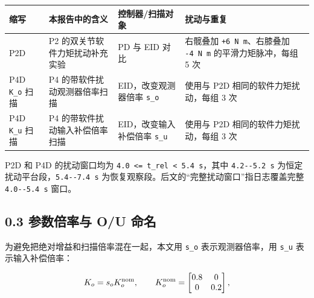\begin{longtable}[]{@{}
  >{\raggedright\arraybackslash}p{}
  >{\raggedright\arraybackslash}p{}
  >{\raggedright\arraybackslash}p{}
  >{\raggedright\arraybackslash}p{}@{}}
\toprule\noalign{}
\begin{minipage}[b]{\linewidth}\raggedright
缩写
\end{minipage} & \begin{minipage}[b]{\linewidth}\raggedright
本报告中的含义
\end{minipage} & \begin{minipage}[b]{\linewidth}\raggedright
控制器/扫描对象
\end{minipage} & \begin{minipage}[b]{\linewidth}\raggedright
扰动与重复
\end{minipage} \\
\midrule\noalign{}
\endhead
\bottomrule\noalign{}
\endlastfoot
P2D & P2 的双关节软件力矩扰动补充实验 & PD 与 EID 对比 & 右髋叠加 \texttt{+6\ N\ m}、右膝叠加 \texttt{-4\ N\ m} 的平滑力矩脉冲，每组 5 次 \\
P4D \texttt{K\_o} 扫描 & P4 的带软件扰动观测器倍率扫描 & EID，改变观测器倍率 \texttt{s\_o} & 使用与 P2D 相同的软件力矩扰动，每组 3 次 \\
P4D \texttt{K\_u} 扫描 & P4 的带软件扰动输入补偿倍率扫描 & EID，改变输入补偿倍率 \texttt{s\_u} & 使用与 P2D 相同的软件力矩扰动，每组 3 次 \\
\end{longtable}

P2D 和 P4D 的扰动窗口均为 \texttt{4.0\ \textless{}=\ t\_rel\ \textless{}\ 5.4\ s}，其中 \texttt{4.2-\/-5.2\ s} 为恒定扰动平台段，\texttt{5.4-\/-7.4\ s} 为恢复观察段。后文的``完整扰动窗口''指日志覆盖完整 \texttt{4.0-\/-5.4\ s} 窗口。

\subsection{0.3 参数倍率与 O/U 命名}\label{ux53c2ux6570ux500dux7387ux4e0e-ou-ux547dux540d}

为避免把绝对增益和扫描倍率混在一起，本文用 \texttt{s\_o} 表示观测器倍率，用 \texttt{s\_u} 表示输入补偿倍率：

\[
K_o=s_oK_o^{\rm nom},\qquad
K_o^{\rm nom}=
\begin{bmatrix}
0.8 & 0\\
0 & 0.2
\end{bmatrix},
\]

